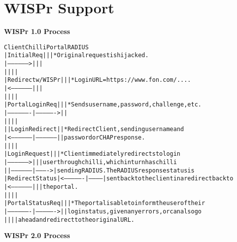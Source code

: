 \section{WISPr Support}

\textbf{WISPr 1.0 Process}
\begin{alltt}\small

Client              Chilli            Portal      RADIUS
  |Initial Req        |                 |           |   * Original request is hijacked.
  |------------------>|                 |           |
  |                   |                 |           |
  |   Redirect w/WISPr|                 |           |   * LoginURL = https://www.fon.com/....
  |<------------------|                 |           |
  |                   |                 |           |
  |Portal Login Req   |                 |           |   * Sends username, password, challenge, etc.
  |-------------------|---------------->|           |
  |                   |                 |           |
  |                   |   Login Redirect|           |   * Redirect Client, sending username and 
  |<------------------|-----------------|           |     password or CHAP response.
  |                   |                 |           |
  |Login Request      |                 |           |   * Client immediately redirects to login
  |------------------>|                 |           |     user through chilli, which in turn has chilli
  |                   |-----------------|---------->|     sending RADIUS. The RADIUS response status is 
  |    Redirect Status|<----------------|-----------|     sent back to the client in a redirect back to 
  |<------------------|                 |           |     the portal.
  |                   |                 |           |
  |Portal Status Req  |                 |           |   * The portal is able to inform the user of their
  |-------------------|---------------->|           |     login status, given any errors, or can also go
  |                   |                 |           |     ahead and redirect to the original URL.
\end{alltt}
\newpage
\textbf{WISPr 2.0 Process}
